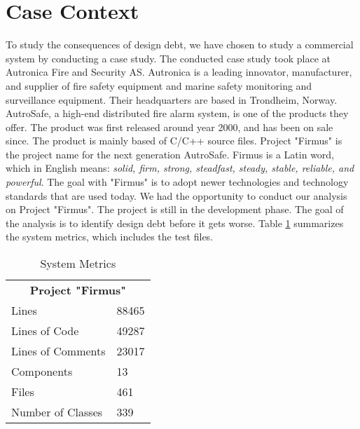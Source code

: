 \section{Case Context}
\label{sec:casecontext}
To study the consequences of design debt, we have chosen to study a commercial system by conducting a case study. The conducted case study took place at Autronica Fire and Security AS. Autronica is a leading innovator, manufacturer, and supplier of fire safety equipment and marine safety monitoring and surveillance equipment. Their headquarters are based in Trondheim, Norway. AutroSafe, a high-end distributed fire alarm system, is one of the products they offer. The product was first released around year 2000, and has been on sale since. The product is mainly based of C/C++ source files. Project "Firmus" is the project name for the next generation AutroSafe. Firmus is a Latin word, which in English means: \textit{solid, firm, strong, steadfast, steady, stable, reliable, and powerful}. The goal with "Firmus" is to adopt newer technologies and technology standards that are used today. We had the opportunity to conduct our analysis on Project "Firmus". The project is still in the development phase. The goal of the analysis is to identify design debt before it gets worse. Table \ref{tab:systemmetrics} summarizes the system metrics, which includes the test files.


\begin{table}[]
\centering
\caption{System Metrics}
\label{tab:systemmetrics}
\begin{tabular}{|l|l|}
\multicolumn{2}{c}{\textbf{Project "Firmus"}} \\
Lines                      & 88465          \\
Lines of Code              & 49287          \\
Lines of Comments          & 23017          \\
Components                 & 13             \\
Files                      & 461            \\
Number of Classes          & 339           
\end{tabular}
\end{table}

